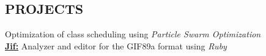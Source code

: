 \documentclass[margin, 10pt]{res} %
\begin{document}
\begin{resume}

\section{PROJECTS}
Optimization of class scheduling using {\it Particle Swarm Optimization}\\
\href{https://github.com/adamrmelnyk/jif}{{\bf Jif:}} Analyzer and editor for the GIF89a format using {\it Ruby} \\ 

\end{resume}
\end{document}

